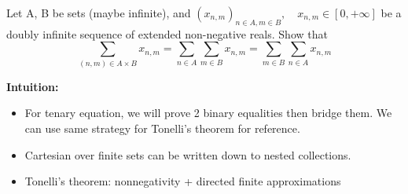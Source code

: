 \newpage
\begin{exercise}
    Let A, B be sets (maybe infinite), and $(x_{n,m})_{n\in A,m\in B},\quad x_{n,m}\in [0, +\infty]$ be a doubly infinite sequence of extended non-negative reals. Show that $$\sum_{(n,m) \in A \times B} x_{n,m} = \sum_{n\in A}\sum_{m\in B} x_{n,m} = \sum_{m\in B}\sum_{n\in A} x_{n,m}$$
\end{exercise}
\textbf{Intuition:}
\begin{itemize}
    \item For tenary equation, we will prove 2 binary equalities then bridge them. We can use same strategy for Tonelli's theorem for reference. 
    \item Cartesian over finite sets can be written down to nested collections.
    \item Tonelli's theorem: nonnegativity + directed finite approximations
\end{itemize}

